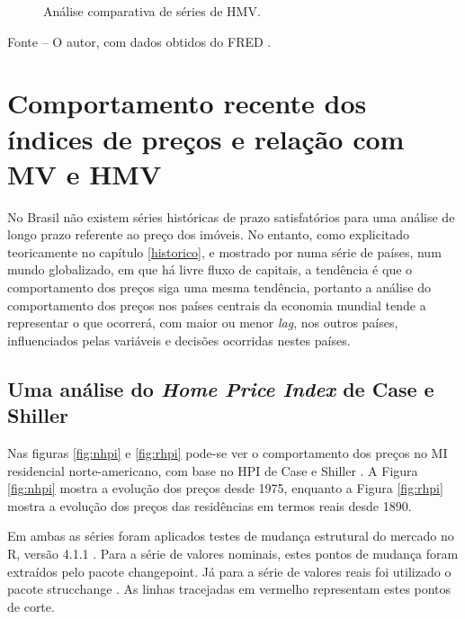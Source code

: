 \documentclass[
	12pt,				%
	oneside,			%
	a4paper,			%
	chapter=TITLE,		%
	section=TITLE,		%
	english,			%
	brazil				%
	]{abntex2}
\newcommand{\pkg}[1]{{\normalfont\fontseries{b}\selectfont #1}}
\let\proglang=\textsf
\newcommand{\bcenter}{\begin{center}}
\newcommand{\ecenter}{\end{center}}
\begin{document}
\begin{refsection}
\begin{figure}[H]
{}

\caption{Análise comparativa de séries de \gls{HMV}.}\label{fig:twoseries}
\end{figure}
\bcenter

\small Fonte -- O autor, com dados obtidos do FRED \autocite{RSAHORUSQ156S,CSUSHPINSA}.
\ecenter

\hypertarget{comportamento-recente-dos-uxedndices-de-preuxe7os-e-relauxe7uxe3o-com-e}{%
\section{\texorpdfstring{Comportamento recente dos índices de preços e relação com \gls{MV} e \gls{HMV}}{Comportamento recente dos índices de preços e relação com  e }}\label{comportamento-recente-dos-uxedndices-de-preuxe7os-e-relauxe7uxe3o-com-e}}

No Brasil não existem séries históricas de prazo satisfatórios para uma análise
de longo prazo referente ao preço dos imóveis. No entanto, como explicitado
teoricamente no capítulo \ref{historico}, e mostrado por \textcite{ADAMS2010} numa
série de países, num mundo globalizado, em que há livre fluxo de capitais, a
tendência é que o comportamento dos preços siga uma mesma tendência, portanto a
análise do comportamento dos preços nos países centrais da economia mundial
tende a representar o que ocorrerá, com maior ou menor \emph{lag}, nos outros países,
influenciados pelas variáveis e decisões ocorridas nestes países.

\hypertarget{uma-anuxe1lise-do-de-case-e-shiller}{%
\subsection{\texorpdfstring{Uma análise do \emph{Home Price Index} de Case e Shiller}{Uma análise do  de Case e Shiller}}\label{uma-anuxe1lise-do-de-case-e-shiller}}

Nas figuras \ref{fig:nhpi} e \ref{fig:rhpi} pode-se ver o comportamento dos
preços no \gls{MI} residencial norte-americano, com base no \gls{HPI} de Case e
Shiller \autocite{NBERw2506}. A Figura \ref{fig:nhpi} mostra a evolução dos preços
desde 1975, enquanto a Figura \ref{fig:rhpi} mostra a evolução dos preços
das residências em termos reais desde 1890.

Em ambas as séries foram aplicados testes de mudança estrutural do mercado no
\proglang{R}, versão 4.1.1 \autocite{R}.
Para a série de valores nominais, estes pontos de mudança foram extraídos pelo
pacote \pkg{changepoint}. Já para a série de valores reais foi utilizado o
pacote \pkg{strucchange} \autocite{strucchange}. As linhas tracejadas em vermelho
representam estes pontos de corte.
\begin{figure}[H]


\end{figure}
\end{refsection}
\end{document}
